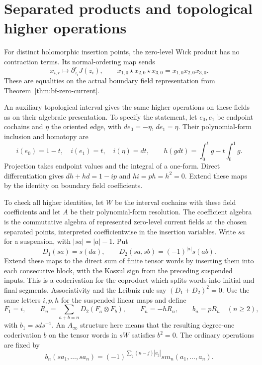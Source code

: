 \section{Separated products and topological higher operations}

For distinct holomorphic insertion points, the zero-level Wick
product has no contraction terms.  Its normal-ordering map sends
\[
 x_{i,r}\longmapsto\partial_{z_i}^rJ(z_i),\qquad
 x_{1,0}\star x_{2,0}\star x_{3,0}
       =x_{1,0}x_{2,0}x_{3,0}.
\]
These are equalities on the actual boundary field representation
from Theorem~\ref{thm:bf-zero-current}.

An auxiliary topological interval gives the same higher operations
on these fields as on their algebraic presentation.  To specify the
statement, let $e_0,e_1$ be endpoint cochains and $\eta$ the oriented
edge, with $de_0=-\eta$, $de_1=\eta$.  Their polynomial-form
inclusion and homotopy are
\[
 i(e_0)=1-t,\quad i(e_1)=t,\quad i(\eta)=dt,
 \qquad
 h(gdt)=\int_0^t g-t\int_0^1g.
\]
Projection takes endpoint values and the integral of a one-form.
Direct differentiation gives $dh+hd=1-ip$ and $hi=ph=h^2=0$.
Extend these maps by the identity on boundary field coefficients.

To check all higher identities, let $W$ be the interval cochains
with these field coefficients and let $A$ be their polynomial-form
resolution.  The coefficient algebra is the commutative algebra of
represented zero-level current fields at the chosen separated points,
interpreted coefficientwise in the insertion variables.  Write $sa$
for a suspension, with $|sa|=|a|-1$.  Put
\[
 D_1(sa)=s(da),\qquad D_2(sa,sb)=(-1)^{|a|}s(ab).
\]
Extend these maps to the direct sum of finite tensor words by inserting
them into each consecutive block, with the Koszul sign from the
preceding suspended inputs.  This is a coderivation for the coproduct
which splits words into initial and final segments.  Associativity
and the Leibniz rule say $(D_1+D_2)^2=0$.
Use the same letters $i,p,h$ for the suspended linear maps and define
\[
 F_1=i,\qquad R_n=\sum_{a+b=n}D_2(F_a\otimes F_b),\qquad
 F_n=-hR_n,\qquad b_n=pR_n\quad(n\ge2),
\]
with $b_1=sds^{-1}$.  An $A_\infty$ structure here means that the
resulting degree-one coderivation $b$ on the tensor words in $sW$
satisfies $b^2=0$.  The ordinary operations are fixed by
\[
 b_n(sa_1,\ldots,sa_n)
 =(-1)^{\sum_j(n-j)|a_j|}s m_n(a_1,\ldots,a_n).
\]


